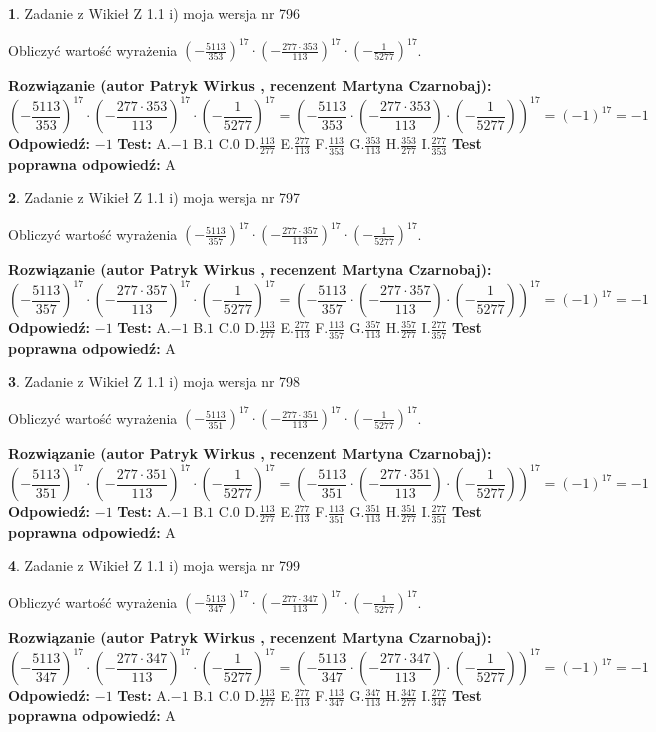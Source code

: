 \documentclass[12pt, a4paper]{article}
\theoremstyle{definition} %
\newtheorem{zad}{}
\newcommand{\zadStart}[1]{\begin{zad}#1\newline}
\newcommand{\zadStop}{\end{zad}}
\newcommand{\rozwStart}[2]{\noindent \textbf{Rozwiązanie (autor #1 , recenzent #2): }\newline}
\newcommand{\rozwStop}{\newline}
\newcommand{\odpStart}{\noindent \textbf{Odpowiedź:}\newline}
\newcommand{\odpStop}{\newline}
\newcommand{\testStart}{\noindent \textbf{Test:}\newline}
\newcommand{\testStop}{\newline}
\newcommand{\kluczStart}{\noindent \textbf{Test poprawna odpowiedź:}\newline}
\newcommand{\kluczStop}{\newline}
\begin{document}
\zadStart{Zadanie z Wikieł Z 1.1 i) moja wersja nr 796}

Obliczyć wartość wyrażenia $(-\frac{5113}{353})^{17} \cdot (-\frac{277 \cdot 353}{113})^{17} \cdot (-\frac{1}{5277})^{17}$.
\zadStop
\rozwStart{Patryk Wirkus}{Martyna Czarnobaj}
$$(-\frac{5113}{353})^{17} \cdot (-\frac{277 \cdot 353}{113})^{17} \cdot (-\frac{1}{5277})^{17} = (-\frac{5113}{353} \cdot (-\frac{277 \cdot 353}{113}) \cdot (-\frac{1}{5277}))^{17} = (-1)^{17} = -1$$
\rozwStop
\odpStart
$-1$
\odpStop
\testStart
A.$-1$ B.$1$ C.$0$ D.$\frac{113}{277}$ E.$\frac{277}{113}$
F.$\frac{113}{353}$ G.$\frac{353}{113}$
H.$\frac{353}{277}$
I.$\frac{277}{353}$
\testStop
\kluczStart
A
\kluczStop



\zadStart{Zadanie z Wikieł Z 1.1 i) moja wersja nr 797}

Obliczyć wartość wyrażenia $(-\frac{5113}{357})^{17} \cdot (-\frac{277 \cdot 357}{113})^{17} \cdot (-\frac{1}{5277})^{17}$.
\zadStop
\rozwStart{Patryk Wirkus}{Martyna Czarnobaj}
$$(-\frac{5113}{357})^{17} \cdot (-\frac{277 \cdot 357}{113})^{17} \cdot (-\frac{1}{5277})^{17} = (-\frac{5113}{357} \cdot (-\frac{277 \cdot 357}{113}) \cdot (-\frac{1}{5277}))^{17} = (-1)^{17} = -1$$
\rozwStop
\odpStart
$-1$
\odpStop
\testStart
A.$-1$ B.$1$ C.$0$ D.$\frac{113}{277}$ E.$\frac{277}{113}$
F.$\frac{113}{357}$ G.$\frac{357}{113}$
H.$\frac{357}{277}$
I.$\frac{277}{357}$
\testStop
\kluczStart
A
\kluczStop



\zadStart{Zadanie z Wikieł Z 1.1 i) moja wersja nr 798}

Obliczyć wartość wyrażenia $(-\frac{5113}{351})^{17} \cdot (-\frac{277 \cdot 351}{113})^{17} \cdot (-\frac{1}{5277})^{17}$.
\zadStop
\rozwStart{Patryk Wirkus}{Martyna Czarnobaj}
$$(-\frac{5113}{351})^{17} \cdot (-\frac{277 \cdot 351}{113})^{17} \cdot (-\frac{1}{5277})^{17} = (-\frac{5113}{351} \cdot (-\frac{277 \cdot 351}{113}) \cdot (-\frac{1}{5277}))^{17} = (-1)^{17} = -1$$
\rozwStop
\odpStart
$-1$
\odpStop
\testStart
A.$-1$ B.$1$ C.$0$ D.$\frac{113}{277}$ E.$\frac{277}{113}$
F.$\frac{113}{351}$ G.$\frac{351}{113}$
H.$\frac{351}{277}$
I.$\frac{277}{351}$
\testStop
\kluczStart
A
\kluczStop



\zadStart{Zadanie z Wikieł Z 1.1 i) moja wersja nr 799}

Obliczyć wartość wyrażenia $(-\frac{5113}{347})^{17} \cdot (-\frac{277 \cdot 347}{113})^{17} \cdot (-\frac{1}{5277})^{17}$.
\zadStop
\rozwStart{Patryk Wirkus}{Martyna Czarnobaj}
$$(-\frac{5113}{347})^{17} \cdot (-\frac{277 \cdot 347}{113})^{17} \cdot (-\frac{1}{5277})^{17} = (-\frac{5113}{347} \cdot (-\frac{277 \cdot 347}{113}) \cdot (-\frac{1}{5277}))^{17} = (-1)^{17} = -1$$
\rozwStop
\odpStart
$-1$
\odpStop
\testStart
A.$-1$ B.$1$ C.$0$ D.$\frac{113}{277}$ E.$\frac{277}{113}$
F.$\frac{113}{347}$ G.$\frac{347}{113}$
H.$\frac{347}{277}$
I.$\frac{277}{347}$
\testStop
\kluczStart
A
\kluczStop
\end{document}
